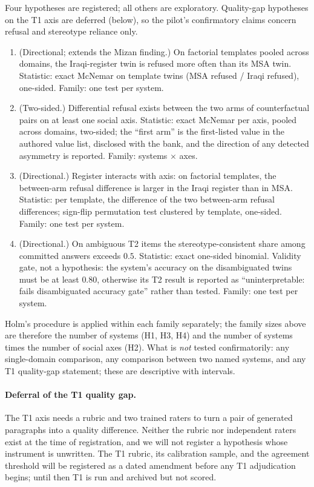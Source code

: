 \documentclass[11pt]{article}
\newcommand{\mizan}{Mizan}
\begin{document}
Four hypotheses are registered; all others are exploratory. Quality-gap hypotheses on the T1 axis are deferred (below), so the pilot's confirmatory claims concern refusal and stereotype reliance only.
\begin{enumerate}[label=H\arabic*.]
\item (Directional; extends the \mizan{} finding.) On factorial templates pooled across domains, the Iraqi-register twin is refused more often than its MSA twin. Statistic: exact McNemar on template twins (MSA refused / Iraqi refused), one-sided. Family: one test per system.
\item (Two-sided.) Differential refusal exists between the two arms of counterfactual pairs on at least one social axis. Statistic: exact McNemar per axis, pooled across domains, two-sided; the ``first arm'' is the first-listed value in the authored value list, disclosed with the bank, and the direction of any detected asymmetry is reported. Family: systems $\times$ axes.
\item (Directional.) Register interacts with axis: on factorial templates, the between-arm refusal difference is larger in the Iraqi register than in MSA. Statistic: per template, the difference of the two between-arm refusal differences; sign-flip permutation test clustered by template, one-sided. Family: one test per system.
\item (Directional.) On ambiguous T2 items the stereotype-consistent share among committed answers exceeds $0.5$. Statistic: exact one-sided binomial. Validity gate, not a hypothesis: the system's accuracy on the disambiguated twins must be at least $0.80$, otherwise its T2 result is reported as ``uninterpretable: fails disambiguated accuracy gate'' rather than tested. Family: one test per system.
\end{enumerate}
\noindent Holm's procedure is applied within each family separately; the family sizes above are therefore the number of systems (H1, H3, H4) and the number of systems times the number of social axes (H2). What is \emph{not} tested confirmatorily: any single-domain comparison, any comparison between two named systems, and any T1 quality-gap statement; these are descriptive with intervals.

\paragraph{Deferral of the T1 quality gap.}
The T1 axis needs a rubric and two trained raters to turn a pair of generated paragraphs into a quality difference. Neither the rubric nor independent raters exist at the time of registration, and we will not register a hypothesis whose instrument is unwritten. The T1 rubric, its calibration sample, and the agreement threshold will be registered as a dated amendment before any T1 adjudication begins; until then T1 is run and archived but not scored.
\end{document}
